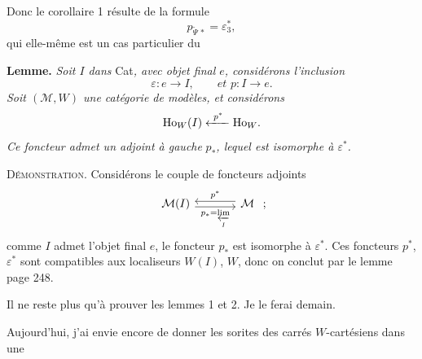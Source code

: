Donc le corollaire 1 résulte de la formule
\[
p_{\tilde{\Psi}\,*}=\varepsilon_3^*,
\]
qui elle-même est un cas particulier du


\textbf{Lemme.} \textit{Soit $I$ dans} Cat\textit{, avec objet final $e$, considérons l'inclusion}
\[
\varepsilon : e\longrightarrow I,\qquad \textit{et } p : I\longrightarrow e.
\]
\textit{Soit $(\mathcal{M},W)$ une catégorie de modèles, et considérons}
\[
\mathrm{Ho}_W(I)\xleftarrow{\ p^*\ }\mathrm{Ho}_W.
\]
\textit{Ce foncteur admet un adjoint à gauche} \textit{$p_*$, lequel est isomorphe à $\varepsilon^*$.}

\textsc{Démonstration}. Considérons le couple de foncteurs adjoints
\[
\begin{tikzcd}[ampersand replacement=\&, column sep=large]
\mathcal{M}(I) \arrow[r, shift right, "p_*=\varprojlim\limits_I"'] \& \mathcal{M} \arrow[l, shift right, "p^*"']
\end{tikzcd}\ ;
\]
comme $I$ admet l'objet final $e$, le foncteur $p_*$ est isomorphe à $\varepsilon^*$. Ces foncteurs $p^*$, $\varepsilon^*$ sont compatibles aux localiseurs $W(I)$, $W$, donc on conclut par le lemme page 248.

Il ne reste plus qu'à prouver les lemmes 1 et 2. Je le ferai demain.

Aujourd'hui, j'ai envie encore de donner les sorites des carrés $W$-cartésiens dans une

